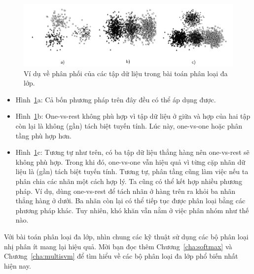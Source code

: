 \begin{figure}[t]
\centering
\includegraphics[width = \textwidth]{Chapters/05_NeuralNetworks/12_binaryclassifiers/latex/dist.pdf}
\caption[]{Ví dụ về phân phối của các tập dữ liệu trong bài toán
phân loại đa lớp.}
\label{fig:10_4}
\end{figure}
\begin{itemize}
\item Hình~\ref{fig:10_4}a: Cả bốn phương pháp trên đây đều có thể áp dụng được.

\item Hình~\ref{fig:10_4}b: One-vs-rest không phù hợp vì tập dữ liệu ở giữa và
hợp của hai tập còn lại là không (gần) {tách biệt tuyến tính}. Lúc này,
one-vs-one hoặc phân tầng phù hợp hơn.

\item Hình~\ref{fig:10_4}c: Tương tự như trên, có ba tập dữ liệu thẳng hàng
nên one-vs-rest sẽ không phù hợp. Trong khi đó, one-vs-one vẫn hiệu quả vì
từng cặp nhãn dữ liệu là (gần) {tách biệt tuyến tính}. Tương tự, phân tầng cũng
làm việc nếu ta phân chia các nhãn một cách hợp lý. Ta cũng có thể kết hợp
nhiều phương pháp. Ví dụ, dùng one-vs-rest để tách nhãn ở hàng trên ra khỏi ba nhãn
thẳng hàng ở dưới. Ba nhãn còn lại có thể tiếp tục được phân loại bằng các phương pháp khác. Tuy nhiên, khó khăn vẫn nằm ở việc phân nhóm như thế nào.
\end{itemize}

Với bài toán phân loại đa lớp, nhìn chung các kỹ thuật sử dụng các bộ phân loại
nhị phân ít mang lại hiệu quả. Mời bạn đọc thêm
Chương~\ref{cha:softmax} và Chương~\ref{cha:multisvm} để tìm hiểu về các bộ phân
loại đa lớp phổ biến nhất hiện nay.




